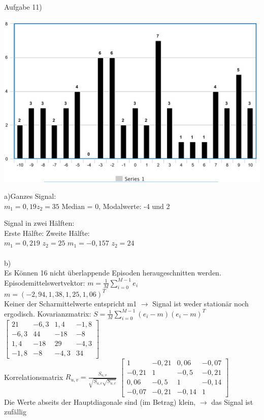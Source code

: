 \documentclass[fleqn,a4paper,12pt]{article}
\begin{document}
Aufgabe 11)

\includegraphics[scale=0.4]{H2}

a)Ganzes Signal:\\
$m_1 = 0,19		z_2 = 35$ \hspace{1cm}
Median = 0,	Modalwerte: -4 und 2

Signal in zwei H\"alften:\\
Erste H\"alfte:	\hspace{5cm}										Zweite H\"alfte:\\
$m_1 = 0,219$  $z_2 = 25$	\hspace{4cm}								$m_1 = -0,157$  $z_2 = 24$\\
\\
b)\\
Es K\"onnen 16 nicht \"uberlappende Episoden heraugeschnitten werden.
Episodemittelswertvektor: $m = \frac{1}{M}\sum_{i=0}^{M-1}e_i$\\
 $m = (-2,94, 1,38, 1,25, 1,06)^T$\\
 Keiner der Scharmittelwerte entspricht m1 $\rightarrow$ Signal ist weder station\"ar noch ergodisch.
 \newpage
 Kovarianzmatrix: $S = \frac{1}{M}\sum_{i=0}^{M-1}(e_i-m)(e_i-m)^T$\\
 $
\begin{bmatrix}
21   & -6,3 & 1,4	 &  -1,8 \\
-6,3 & 44 	& -18	 &  -8 \\
1,4  & -18	& 29 	 & -4,3 \\
-1,8 & -8 	& -4,3	 &  34
\end{bmatrix}
$\\
Korrelationsmatrix $R_{u,v} = \frac{S_{u,v}}{\sqrt{S_{u,v} \sqrt{S_{u,v}}}}$
 $
\begin{bmatrix}
1   & -0,21 & 0,06	 &  -0,07 \\
-0,21 & 1 	& -0,5	 &  -0,21 \\
0,06  & -0,5	& 1 	 & -0,14 \\
-0,07 & -0,21 	& -0,14	 &  1
\end{bmatrix}
$\\Die Werte abseits der Hauptdiagonale sind (im Betrag) klein, $\rightarrow$ das Signal ist zuf\"allig\\
\end{document}
